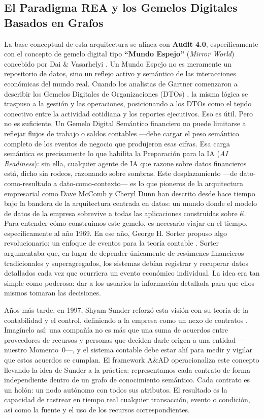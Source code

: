 \documentclass[12pt, a4paper]{article}
\begin{document}
\subsection{El Paradigma REA y los Gemelos Digitales Basados en Grafos}
La base conceptual de esta arquitectura se alinea con \textbf{Audit 4.0}, específicamente con el concepto de gemelo digital tipo \textbf{``Mundo Espejo''} (\textit{Mirror World}) concebido por Dai \& Vasarhelyi \cite{dai2016}. Un Mundo Espejo no es meramente un repositorio de datos, sino un reflejo activo y semántico de las interacciones económicas del mundo real. Cuando los analistas de Gartner comenzaron a describir los Gemelos Digitales de Organizaciones (DTOs) \cite{gartner2023}, la misma lógica se traspuso a la gestión y las operaciones, posicionando a los DTOs como el tejido conectivo entre la actividad cotidiana y los reportes ejecutivos. Eso es útil. Pero no es suficiente. Un Gemelo Digital Semántico financiero no puede limitarse a reflejar flujos de trabajo o saldos contables ---debe cargar el peso semántico completo de los eventos de negocio que produjeron esas cifras. Esa carga semántica es precisamente lo que habilita la Preparación para la IA (\textit{AI Readiness}): sin ella, cualquier agente de IA que razone sobre datos financieros está, dicho sin rodeos, razonando sobre sombras. Este desplazamiento ---de dato-como-resultado a dato-como-contexto--- es lo que pioneros de la arquitectura empresarial como Dave McComb \cite{mccomb2019} y Cheryl Dunn \cite{dunn2004} han descrito desde hace tiempo bajo la bandera de la arquitectura centrada en datos: un mundo donde el modelo de datos de la empresa sobrevive a todas las aplicaciones construidas sobre él. Para entender cómo construimos este gemelo, es necesario viajar en el tiempo, específicamente al año 1969. En ese año, George H. Sorter propuso algo revolucionario: un enfoque de eventos para la teoría contable \cite{sorter1969}. Sorter argumentaba que, en lugar de depender únicamente de resúmenes financieros tradicionales y superagregados, los sistemas debían registrar y recuperar datos detallados cada vez que ocurriera un evento económico individual. La idea era tan simple como poderosa: dar a los usuarios la información detallada para que ellos mismos tomaran las decisiones.

Años más tarde, en 1997, Shyam Sunder reforzó esta visión con su teoría de la contabilidad y el control, definiendo a la empresa como un nexo de contratos \cite{sunder1997}. Imagínelo así: una compañía no es más que una suma de acuerdos entre proveedores de recursos y personas que deciden darle origen a una entidad ---nuestro Momento~0---, y el sistema contable debe estar ahí para medir y vigilar que estos acuerdos se cumplan. El framework A\&AD operacionaliza este concepto llevando la idea de Sunder a la práctica: representamos cada contrato de forma independiente dentro de un grafo de conocimiento semántico. Cada contrato es un holón: un nodo autónomo con todos sus atributos. El resultado es la capacidad de rastrear en tiempo real cualquier transacción, evento o condición, así como la fuente y el uso de los recursos correspondientes.
\end{document}
